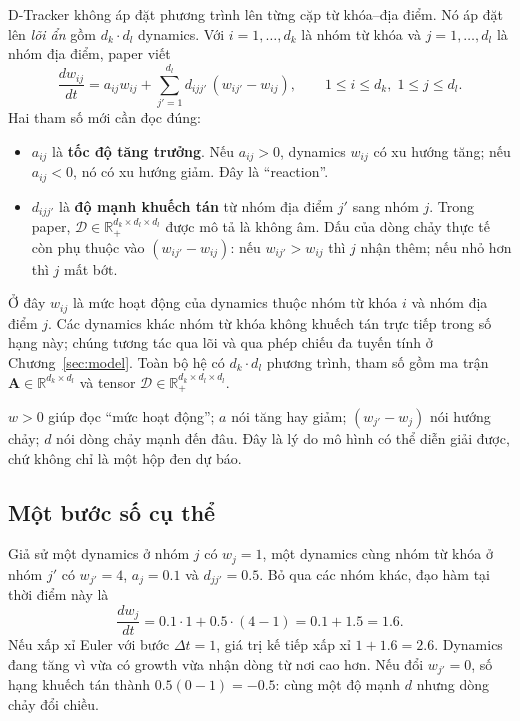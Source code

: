 D-Tracker không áp đặt phương trình lên từng cặp từ khóa--địa điểm. Nó áp đặt lên \emph{lõi ẩn}
gồm $d_k\cdot d_l$ dynamics. Với $i=1,\ldots,d_k$ là nhóm từ khóa và $j=1,\ldots,d_l$ là nhóm
địa điểm, paper viết
\begin{equation}
  \frac{dw_{ij}}{dt}
  =a_{ij}w_{ij}
   +\sum_{j'=1}^{d_l} d_{ijj'}\,(w_{ij'}-w_{ij}),
  \qquad 1\leq i\leq d_k,\;1\leq j\leq d_l.
  \label{eq:rd-latent}
\end{equation}
Hai tham số mới cần đọc đúng:
\begin{itemize}
  \item $a_{ij}$ là \textbf{tốc độ tăng trưởng}. Nếu $a_{ij}>0$, dynamics $w_{ij}$ có xu hướng
        tăng; nếu $a_{ij}<0$, nó có xu hướng giảm. Đây là ``reaction''.
  \item $d_{ijj'}$ là \textbf{độ mạnh khuếch tán} từ nhóm địa điểm $j'$ sang nhóm $j$. Trong paper,
        $\mathcal{D}\in\mathbb{R}_{+}^{d_k\times d_l\times d_l}$ được mô tả là không âm. Dấu của
        dòng chảy thực tế còn phụ thuộc vào $(w_{ij'}-w_{ij})$: nếu $w_{ij'}>w_{ij}$ thì $j$ nhận
        thêm; nếu nhỏ hơn thì $j$ mất bớt.
\end{itemize}

Ở đây $w_{ij}$ là mức hoạt động của dynamics thuộc nhóm từ khóa $i$ và nhóm địa điểm $j$. Các
dynamics khác nhóm từ khóa không khuếch tán trực tiếp trong số hạng này; chúng tương tác qua lõi
và qua phép chiếu đa tuyến tính ở Chương~\ref{sec:model}. Toàn bộ hệ có $d_k\cdot d_l$ phương
trình, tham số gồm ma trận $\mathbf{A}\in\mathbb{R}^{d_k\times d_l}$ và tensor
$\mathcal{D}\in\mathbb{R}_{+}^{d_k\times d_l\times d_l}$.

\begin{keypoint}
$w>0$ giúp đọc ``mức hoạt động''; $a$ nói tăng hay giảm; $(w_{j'}-w_j)$ nói hướng chảy; $d$ nói
dòng chảy mạnh đến đâu. Đây là lý do mô hình có thể diễn giải được, chứ không chỉ là một hộp đen
dự báo.
\end{keypoint}

\subsection{Một bước số cụ thể}

Giả sử một dynamics ở nhóm $j$ có $w_j=1$, một dynamics cùng nhóm từ khóa ở nhóm $j'$ có
$w_{j'}=4$, $a_j=0.1$ và $d_{jj'}=0.5$. Bỏ qua các nhóm khác, đạo hàm tại thời điểm này là
\[
  \frac{dw_j}{dt}=0.1\cdot1+0.5\cdot(4-1)=0.1+1.5=1.6.
\]
Nếu xấp xỉ Euler với bước $\Delta t=1$, giá trị kế tiếp xấp xỉ $1+1.6=2.6$. Dynamics đang tăng
vì vừa có growth vừa nhận dòng từ nơi cao hơn. Nếu đổi $w_{j'}=0$, số hạng khuếch tán thành
$0.5(0-1)=-0.5$: cùng một độ mạnh $d$ nhưng dòng chảy đổi chiều.

